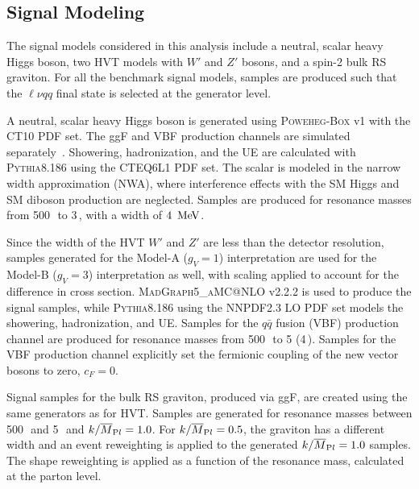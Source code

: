 %
\subsection{Signal Modeling}
\label{ch:anstrat:sm}
The signal models considered in this analysis include a neutral, scalar heavy Higgs boson, two HVT models with $W'$ and $Z'$ bosons, and a spin-2 bulk RS graviton. For all the benchmark signal models, samples are produced such that the $\ell\nu qq$ final state is selected at the generator level.

A neutral, scalar heavy Higgs boson is generated using \textsc{Poweheg-Box} v1 with the \textsc{CT10} PDF set. The ggF and VBF production channels are simulated separately~\cite{heavy_higgs_VBF,heavy_higgs_ggF}.  Showering, hadronization, and the UE are calculated with \textsc{Pythia}8.186 using the \textsc{CTEQ6L1} PDF set. The scalar is modeled in the narrow width approximation (NWA), where interference effects with the SM Higgs and SM diboson production are neglected. Samples are produced for resonance masses from 500\,\GeV\, to 3\,\TeV, with a width of $4\,\MeV$.  

Since the width of the HVT $W'$ and $Z'$ are less than the detector resolution, samples generated for the Model-A ($g_V=1$) interpretation are used for the Model-B ($g_V=3$) interpretation as well, with scaling applied to account for the difference in cross section. \textsc{MadGraph5\_aMC@NLO} v2.2.2 is used to produce the signal samples, while \textsc{Pythia}8.186 using the \textsc{NNPDF2.3} LO PDF set models the showering, hadronization, and UE. %
Samples for the $q\bar{q}$ fusion (VBF) production channel are produced for resonance masses from 500\,\GeV\, to 5\,\TeV\,(4\,\TeV). Samples for the VBF production channel explicitly set the fermionic coupling of the new vector bosons to zero, $c_F=0$.

Signal samples for the bulk RS graviton, produced via ggF, are created using the same generators as for HVT. Samples are generated for resonance masses between 500\,\GeV\, and 5\,\TeV\, and $k/\overline{M}_{\textrm Pl}=1.0$. For $k/\overline{M}_{\textrm Pl}=0.5$, the graviton has a different width and an event reweighting is applied to the generated $k/\overline{M}_{\textrm Pl}=1.0$ samples. The shape reweighting is applied as a function of the resonance mass, calculated at the parton level.

%
